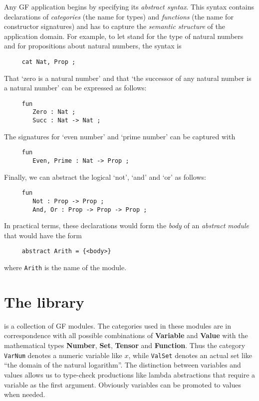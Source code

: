 \documentclass[submission,copyright,creativecommons]{eptcs}
\begin{document}
Any GF application begins by specifying its \emph{abstract syntax}. This
syntax contains declarations of \emph{categories} (the \GF{} name for
types) and \emph{functions} (the \GF{} name for constructor signatures) and
has to capture the \emph{semantic structure} of the application domain.
For example, to let \Nat{} stand for the type of natural numbers and
\Prop{} for propositions about natural numbers, the \GF{} syntax is
{\small
\begin{verbatim}
     cat Nat, Prop ;
\end{verbatim}
}
That `zero is a natural number' and that `the successor of
any natural number is a natural number' can be expressed as follows:
{\small
\begin{verbatim}
     fun
        Zero : Nat ;
        Succ : Nat -> Nat ;
\end{verbatim}
}
The signatures for `even number' and `prime number' can be captured with
{\small
\begin{verbatim}
     fun
        Even, Prime : Nat -> Prop ;
\end{verbatim}
}
Finally, we can abstract the logical `not', `and' and `or' as follows:
{\small
\begin{verbatim}
     fun
        Not : Prop -> Prop ;
        And, Or : Prop -> Prop -> Prop ;
\end{verbatim}
}
In practical terms, these declarations would form the \emph{body} of an
\emph{abstract module} that would have the form
{\small
\begin{verbatim}
     abstract Arith = {<body>}
\end{verbatim}
}
where \texttt{Arith} is the name of the module.



\section{The library} %
\label{sec:the_library}

\MGL{} is a collection of GF modules. The categories used in these modules
are in correspondence with all possible combinations of \textbf{Variable}
and \textbf{Value} with the mathematical types
\textbf{Number}, \textbf{Set}, \textbf{Tensor} and \textbf{Function}.
Thus the category \texttt{VarNum} denotes a numeric
variable like $x$, while \texttt{ValSet} denotes an actual set like ``the
domain of the natural logarithm''.  The distinction between variables and
values allows us to type-check productions like lambda abstractions that
require a variable as the first argument.  Obviously variables can be
promoted to values when needed.
\end{document}
